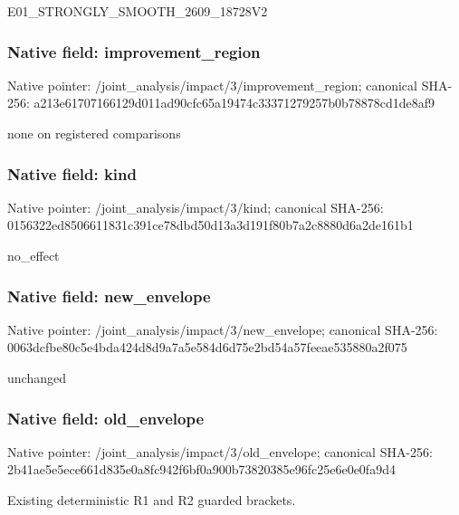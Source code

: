 \documentclass[10pt,a4paper]{article}
\begin{document}
\begingroup\raggedright\sloppy E01\_\allowbreak{}STRONGLY\_\allowbreak{}SMOOTH\_\allowbreak{}2609\_\allowbreak{}18728V2\par\endgroup

\subsubsection{Native field: improvement\_\allowbreak{}region}
Native pointer: /joint\_\allowbreak{}analysis/impact/3/improvement\_\allowbreak{}region; canonical SHA-256: a213e61707166129d011ad90cfc65a19474c33371279257b0b78878cd1de8af9

\begingroup\raggedright\sloppy none on registered comparisons\par\endgroup

\subsubsection{Native field: kind}
Native pointer: /joint\_\allowbreak{}analysis/impact/3/kind; canonical SHA-256: 0156322ed8506611831c391ce78dbd50d13a3d191f80b7a2c8880d6a2de161b1

\begingroup\raggedright\sloppy no\_\allowbreak{}effect\par\endgroup

\subsubsection{Native field: new\_\allowbreak{}envelope}
Native pointer: /joint\_\allowbreak{}analysis/impact/3/new\_\allowbreak{}envelope; canonical SHA-256: 0063dcfbe80c5e4bda424d8d9a7a5e584d6d75e2bd54a57feeae535880a2f075

\begingroup\raggedright\sloppy unchanged\par\endgroup

\subsubsection{Native field: old\_\allowbreak{}envelope}
Native pointer: /joint\_\allowbreak{}analysis/impact/3/old\_\allowbreak{}envelope; canonical SHA-256: 2b41ae5e5ece661d835e0a8fc942f6bf0a900b73820385e96fc25e6e0e0fa9d4

\begingroup\raggedright\sloppy Existing deterministic R1 and R2 guarded brackets.\par\endgroup
\end{document}
